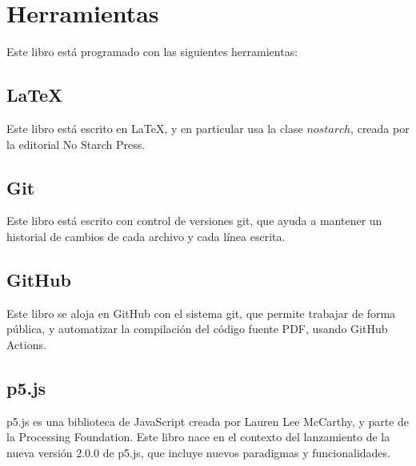 \documentclass[../principal.tex]{subfiles}
\begin{document}
\chapter{Herramientas}

Este libro está programado con las siguientes herramientas:

\section{LaTeX}

Este libro está escrito en LaTeX, y en particular usa la clase $nostarch$, creada por la editorial No Starch Press.

\section{Git}

Este libro está escrito con control de versiones git, que ayuda a mantener un historial de cambios de cada archivo y cada línea escrita.

\section{GitHub}

Este libro se aloja en GitHub con el sistema git, que permite trabajar de forma pública, y automatizar la compilación del código fuente PDF, usando GitHub Actions.

\section{p5.js}

p5.js es una biblioteca de JavaScript creada por Lauren Lee McCarthy, y parte de la Processing Foundation. Este libro nace en el contexto del lanzamiento de la nueva versión 2.0.0 de p5.js, que incluye nuevos paradigmas y funcionalidades.


\newpage
\end{document}

